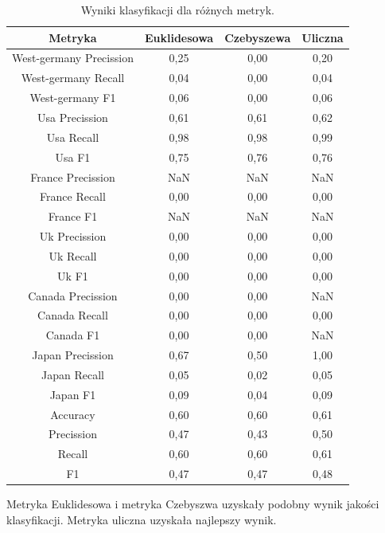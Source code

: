 \documentclass{classrep}
\begin{document}
\newpage
\begin{table}[h!]
\caption{Wyniki klasyfikacji dla różnych metryk.}
\centering
\vspace{0.1cm}
 \begin{tabular}{c c c c}

    \textbf{Metryka} & \textbf{Euklidesowa}   & \textbf{Czebyszewa}  & \textbf{Uliczna}  \\

\hline
West-germany Precission 	& 0,25 & 0,00 & 0,20 \\
West-germany Recall 		& 0,04 & 0,00 & 0,04 \\
West-germany F1		& 0,06 & 0,00 & 0,06 \\
\hline
Usa Precission 			& 0,61 & 0,61 & 0,62 \\
Usa Recall				& 0,98 & 0,98 & 0,99 \\
Usa F1			 	& 0,75 & 0,76 & 0,76 \\
\hline
France Precission 		& NaN & NaN & NaN \\
France Recall 			& 0,00 & 0,00 & 0,00 \\
France F1 				& NaN & NaN & NaN \\
\hline
Uk Precission 			& 0,00 & 0,00 & 0,00 \\
Uk Recall 				& 0,00 & 0,00 & 0,00 \\
Uk F1 				& 0,00 & 0,00 & 0,00 \\
\hline
Canada Precission		& 0,00 & 0,00 & NaN \\
Canada Recall 			& 0,00 & 0,00 & 0,00 \\
Canada F1 			& 0,00 & 0,00 & NaN \\
\hline
Japan Precission 		& 0,67 & 0,50 & 1,00 \\
Japan Recall 			& 0,05 & 0,02 & 0,05 \\
Japan F1 				& 0,09 & 0,04 & 0,09 \\
\hline
Accuracy 				& 0,60 & 0,60 & 0,61 \\
Precission 				& 0,47 & 0,43 & 0,50 \\
Recall 				& 0,60 & 0,60 & 0,61 \\
F1 					& 0,47 & 0,47 & 0,48 \\

\end {tabular}
\label {Wyniki klasyfikacji dla różnych metryk.}
\end{table}


Metryka Euklidesowa i metryka Czebyszwa uzyskały podobny wynik jakości klasyfikacji. Metryka uliczna uzyskała najlepszy wynik. 
\end{document}
